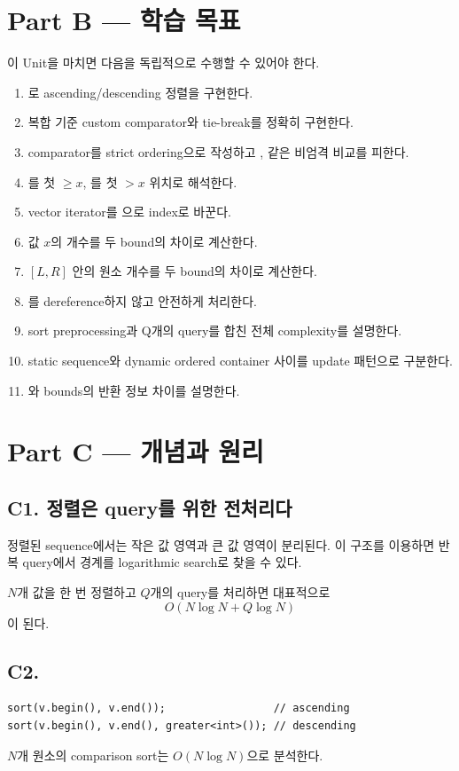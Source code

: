 \section{Part B --- 학습 목표}
이 Unit을 마치면 다음을 독립적으로 수행할 수 있어야 한다.
\begin{enumerate}
\item {}로 ascending/descending 정렬을 구현한다.
\item 복합 기준 custom comparator와 tie-break를 정확히 구현한다.
\item comparator를 strict ordering으로 작성하고 \code{<=}, \code{>=} 같은 비엄격 비교를 피한다.
\item {}를 첫 $\ge x$, 를 첫 $>x$ 위치로 해석한다.
\item vector iterator를 으로 index로 바꾼다.
\item 값 $x$의 개수를 두 bound의 차이로 계산한다.
\item $[L,R]$ 안의 원소 개수를 두 bound의 차이로 계산한다.
\item {}를 dereference하지 않고 안전하게 처리한다.
\item sort preprocessing과 Q개의 query를 합친 전체 complexity를 설명한다.
\item static sequence와 dynamic ordered container 사이를 update 패턴으로 구분한다.
\item {}와 bounds의 반환 정보 차이를 설명한다.
\end{enumerate}

\section{Part C --- 개념과 원리}

\subsection{C1. 정렬은 query를 위한 전처리다}
정렬된 sequence에서는 작은 값 영역과 큰 값 영역이 분리된다. 이 구조를 이용하면 반복 query에서 경계를 logarithmic search로 찾을 수 있다.

$N$개 값을 한 번 정렬하고 $Q$개의 query를 처리하면 대표적으로
\[
O(N\log N+Q\log N)
\]
이 된다.

\subsection{C2. }
\begin{lstlisting}
sort(v.begin(), v.end());                 // ascending
sort(v.begin(), v.end(), greater<int>()); // descending
\end{lstlisting}
$N$개 원소의 comparison sort는 $O(N\log N)$으로 분석한다.

